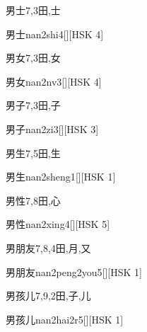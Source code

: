 \begin{Entry}{男士}{7,3}{⽥,⼠}
  \begin{Phonetics}{男士}{nan2shi4}[][HSK 4]
  \end{Phonetics}
\end{Entry}

\begin{Entry}{男女}{7,3}{⽥,⼥}
  \begin{Phonetics}{男女}{nan2nv3}[][HSK 4]
  \end{Phonetics}
\end{Entry}

\begin{Entry}{男子}{7,3}{⽥,⼦}
  \begin{Phonetics}{男子}{nan2zi3}[][HSK 3]
  \end{Phonetics}
\end{Entry}

\begin{Entry}{男生}{7,5}{⽥,⽣}
  \begin{Phonetics}{男生}{nan2sheng1}[][HSK 1]
  \end{Phonetics}
\end{Entry}

\begin{Entry}{男性}{7,8}{⽥,⼼}
  \begin{Phonetics}{男性}{nan2xing4}[][HSK 5]
  \end{Phonetics}
\end{Entry}

\begin{Entry}{男朋友}{7,8,4}{⽥,⽉,⼜}
  \begin{Phonetics}{男朋友}{nan2peng2you5}[][HSK 1]
  \end{Phonetics}
\end{Entry}

\begin{Entry}{男孩儿}{7,9,2}{⽥,⼦,⼉}
  \begin{Phonetics}{男孩儿}{nan2hai2r5}[][HSK 1]
  \end{Phonetics}
\end{Entry}

